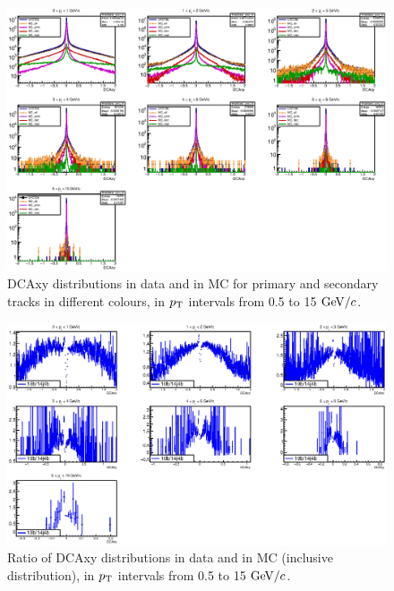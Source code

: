 \begin{figure}[!htb]
\begin{center}
\includegraphics[width=.99\textwidth]{FigCap4/components_b_VsPt.eps}
\caption{DCAxy distributions in data and in MC for primary and secondary tracks in different colours, in $p_{\rm T}$ intervals from 0.5 to 15 $\mathrm{GeV}/c$.}
\label{fig:DCAxyDataMCVsPt}
\end{center}
\end{figure}

\begin{figure}[!htb]
\begin{center}
\includegraphics[width=.99\textwidth]{FigCap4/ratioDataMC_b_VsPt.eps}
\caption{Ratio of DCAxy distributions in data and in MC (inclusive distribution), in $p_{\rm T}$ intervals from 0.5 to 15 $\mathrm{GeV}/c$.}
\label{fig:DCAxyRatioDataMCVsPt}
\end{center}
\end{figure}

